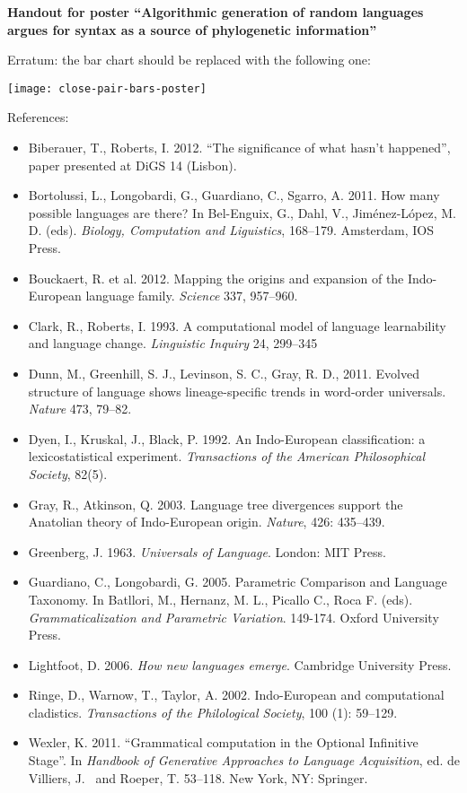 \documentclass{article}
\begin{document}
\begin{center}
    \textbf{Handout for poster “Algorithmic generation of random languages argues for syntax as a source of phylogenetic information”}
\end{center}

Erratum: the bar chart should be replaced with the following one:

\texttt{[image: close-pair-bars-poster]}

\noindent{}References:

\begin{itemize}
  \item Biberauer, T., Roberts, I. 2012. “The significance of what hasn’t
    happened”, paper presented at DiGS 14 (Lisbon).
  \item Bortolussi, L., Longobardi, G., Guardiano, C., Sgarro,
    A. 2011. How many possible languages are there? In Bel-Enguix, G.,
    Dahl, V., Jiménez-López, M. D. (eds). \emph{Biology, Computation and
    Liguistics}, 168–179. Amsterdam, IOS Press.
  \item Bouckaert, R. et al. 2012. Mapping the origins and expansion of
    the Indo-European language family. \emph{Science} 337, 957–960.
  \item Clark, R., Roberts, I. 1993. A computational model of language
    learnability and language change. \emph{Linguistic Inquiry} 24, 299–345
  \item Dunn, M., Greenhill, S. J., Levinson, S. C., Gray, R. D.,
    2011. Evolved structure of language shows lineage-specific trends in
    word-order universals.  \emph{Nature} 473, 79–82.
  \item Dyen, I., Kruskal, J., Black, P. 1992. An Indo-European
    classification: a lexicostatistical experiment. \emph{Transactions
        of the American Philosophical Society}, 82(5).
  \item Gray, R., Atkinson, Q. 2003. Language tree divergences support
    the Anatolian theory of Indo-European origin. \emph{Nature}, 426:
    435–439.
  \item Greenberg, J. 1963. \emph{Universals of Language}. London: MIT Press.
  \item Guardiano, C., Longobardi, G. 2005. Parametric Comparison and
    Language Taxonomy. In Batllori, M., Hernanz, M. L., Picallo C., Roca
    F. (eds). \emph{Grammaticalization and Parametric
    Variation}. 149-174. Oxford University Press.
  \item Lightfoot, D. 2006. \emph{How new languages emerge}. Cambridge
    University Press.
  \item Ringe, D., Warnow, T., Taylor, A. 2002. Indo-European and computational
    cladistics. \emph{Transactions of the Philological Society}, 100 (1):
    59–129.
  \item Wexler, K. 2011. “Grammatical computation in the Optional
    Infinitive Stage”. In \emph{Handbook of Generative Approaches to
        Language Acquisition}, ed. de Villiers, J.~ and Roeper,
    T. 53–118. New York, NY: Springer.
\end{itemize}
\end{document}
